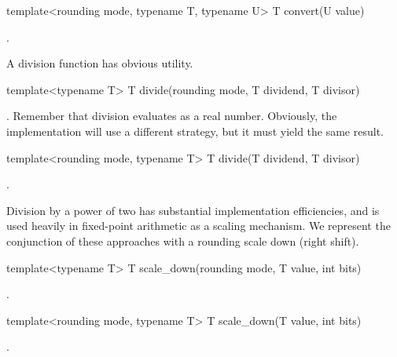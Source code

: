 \begin{addedblock}
\begin{itemdecl}
template<rounding mode, typename T, typename U> T convert(U value)		
\end{itemdecl}

\begin{itemdescr}
\returns {}.	
\end{itemdescr}

A division function has obvious utility.

\begin{itemdecl}
template<typename T> T divide(rounding mode, T dividend, T divisor)		
\end{itemdecl}

\begin{itemdescr}
\returns {}. Remember that division evaluates as a real number. Obviously, the implementation will use a different strategy, but it must yield the same result.	
\end{itemdescr}

\begin{itemdecl}
template<rounding mode, typename T> T divide(T dividend, T divisor)		
\end{itemdecl}

\begin{itemdescr}
\returns {}.	
\end{itemdescr}

Division by a power of two has substantial implementation efficiencies, and is used heavily in fixed-point arithmetic as a scaling mechanism. We represent the conjunction of these approaches with a rounding scale down (right shift).

\begin{itemdecl}
template<typename T> T scale_down(rounding mode, T value, int bits)		
\end{itemdecl}

\begin{itemdescr}
\returns {}.	
\end{itemdescr}

\begin{itemdecl}
template<rounding mode, typename T> T scale_down(T value, int bits)		
\end{itemdecl}

\begin{itemdescr}
\returns {}.	
\end{itemdescr}


\end{addedblock}
